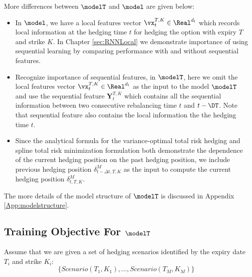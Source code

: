 More differences between $\modelT$ and $\model$ are given below:
\begin{itemize}
	
\item In $\model$, we have a local features vector $\vx^{T,K}_{t} \in \Real^{d_l}$ which records local information at the hedging time $t$ for hedging the option with expiry $T$ and strike $K$. In Chapter \ref{sec:RNNLocal} we demonstrate importance of using sequential learning by  comparing performance with and without sequential features. 

\item Recognize importance of sequential features, in $\modelT$, here we omit the local features vector $\vx^{T,K}_{t} \in \Real^{d_l}$ as the input to the model $\modelT$ and use the sequential feature  $\mathbf{Y}_{t}^{T,K}$ which contains all the sequential information between two consecutive rebalancing time $t$ and $t-\DT$. 
Note that sequential feature also contains the local information the the hedging time $t$.

\item Since the analytical formula for the variance-optimal total risk hedging \cite{schweizer1995variance} and spline total risk minimization formulation \cite{coleman2007total} both  demonstrate the dependence of the current hedging position on the past hedging position, we include previous hedging position $\delta^{M}_{t-\Delta t,T,K}$ as the input to compute the current hedging position $\delta^{M}_{t,T,K}$. 
	
\end{itemize}

The more details of the  model structure of $\modelT$ is discussed in Appendix \ref{App:modelstructure}.


\subsection{Training Objective For $\modelT$}
\label{sec:TotalModelObj}
Assume that we are given  a set  of hedging scenarios identified by the expiry date $T_i$ and strike $K_i$:
\[
\{Scenario(T_1,K_1), \dots, Scenario(T_M,K_M)\}	
\]


